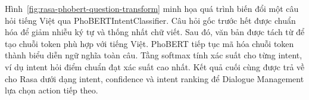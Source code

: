 Hình~\ref{fig:rasa-phobert-question-transform} minh họa quá trình biến đổi một câu hỏi tiếng Việt qua PhoBERTIntentClassifier. Câu hỏi gốc trước hết được chuẩn hóa để giảm nhiễu ký tự và thống nhất chữ viết. Sau đó, văn bản được tách từ để tạo chuỗi token phù hợp với tiếng Việt. PhoBERT tiếp tục mã hóa chuỗi token thành biểu diễn ngữ nghĩa toàn câu. Tầng softmax tính xác suất cho từng intent, ví dụ intent hỏi điểm chuẩn đạt xác suất cao nhất. Kết quả cuối cùng được trả về cho Rasa dưới dạng intent, confidence và intent ranking để Dialogue Management lựa chọn action tiếp theo.

